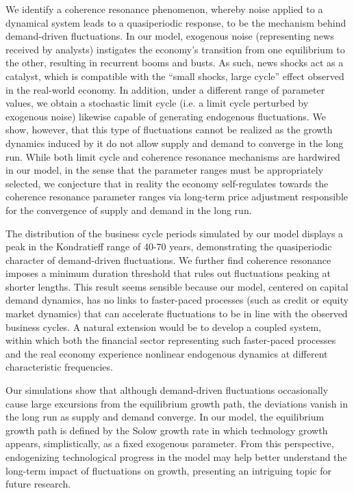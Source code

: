 \documentclass[authoryear, review]{elsarticle}
\begin{document}
We identify a coherence resonance phenomenon, whereby noise applied to a dynamical system leads to a quasiperiodic response, to be the mechanism behind demand-driven fluctuations. In our model, exogenous noise (representing news received by analysts) instigates the economy’s transition from one equilibrium to the other, resulting in recurrent booms and busts. As such, news shocks act as a catalyst, which is compatible with the ``small shocks, large cycle'' effect observed in the real-world economy. In addition, under a different range of parameter values, we obtain a stochastic limit cycle (i.e. a limit cycle perturbed by exogenous noise) likewise capable of generating endogenous fluctuations. We show, however, that this type of fluctuations cannot be realized as the growth dynamics induced by it do not allow supply and demand to converge in the long run. While both limit cycle and coherence resonance mechanisms are hardwired in our model, in the sense that the parameter ranges must be appropriately selected, we conjecture that in reality the economy self-regulates towards the coherence resonance parameter ranges via long-term price adjustment responsible for the convergence of supply and demand in the long run.

The distribution of the business cycle periods simulated by our model displays a peak in the Kondratieff range of 40-70 years, demonstrating the quasiperiodic character of demand-driven fluctuations. We further find coherence resonance imposes a minimum duration threshold that rules out fluctuations peaking at shorter lengths. This result seems sensible because our model, centered on capital demand dynamics, has no links to faster-paced processes (such as credit or equity market dynamics) that can accelerate fluctuations to be in line with the observed business cycles. A natural extension would be to develop a coupled system, within which both the financial sector representing such faster-paced processes and the real economy experience nonlinear endogenous dynamics at different characteristic frequencies.

Our simulations show that although demand-driven fluctuations occasionally cause large excursions from the equilibrium growth path, the deviations vanish in the long run as supply and demand converge. In our model, the equilibrium growth path is defined by the Solow growth rate in which technology growth appears, simplistically, as a fixed exogenous parameter. From this perspective, endogenizing technological progress in the model may help better understand the long-term impact of fluctuations on growth, presenting an intriguing topic for future research.
\end{document}
